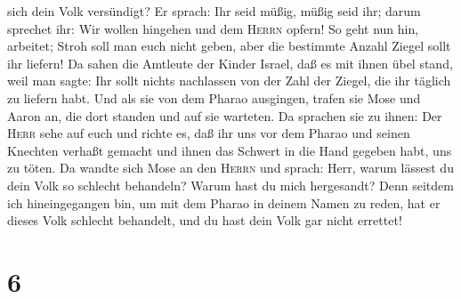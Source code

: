 sich dein Volk versündigt?  Er sprach: Ihr seid müßig,
müßig seid ihr; darum sprechet ihr: Wir wollen hingehen und dem
\textsc{Herrn} opfern!  So geht nun hin, arbeitet; Stroh
soll man euch nicht geben, aber die bestimmte Anzahl Ziegel sollt ihr
liefern!  Da sahen die Amtleute der Kinder Israel, daß es
mit ihnen übel stand, weil man sagte: Ihr sollt nichts nachlassen von
der Zahl der Ziegel, die ihr täglich zu liefern habt. 
Und als sie von dem Pharao ausgingen, trafen sie Mose und Aaron an, die
dort standen und auf sie warteten.  Da sprachen sie zu
ihnen: Der \textsc{Herr} sehe auf euch und richte es, daß ihr uns vor
dem Pharao und seinen Knechten verhaßt gemacht und ihnen das Schwert in
die Hand gegeben habt, uns zu töten.  Da wandte sich Mose
an den \textsc{Herrn} und sprach: Herr, warum lässest du dein Volk so
schlecht behandeln? Warum hast du mich hergesandt?  Denn
seitdem ich hineingegangen bin, um mit dem Pharao in deinem Namen zu
reden, hat er dieses Volk schlecht behandelt, und du hast dein Volk gar
nicht errettet!

\hypertarget{section-5}{%
\section{6}\label{section-5}}

